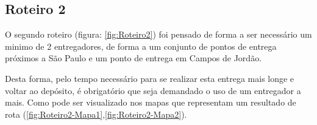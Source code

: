\begin{center}
	\label{fig:Roteiro1-G500P50-SwapMutation}
\end{center}


\subsection{Roteiro 2}

O segundo roteiro (figura: \ref{fig:Roteiro2}) foi pensado de forma a ser necessário um minimo de 2 entregadores, de forma a um conjunto de pontos de entrega próximos a São Paulo e um ponto de entrega em Campos de Jordão.

Desta forma, pelo tempo necessário para se realizar esta entrega mais longe e voltar ao depósito, é obrigatório que seja demandado o uso de um entregador a mais. Como pode ser visualizado nos mapas que representam um resultado de rota (\ref{fig:Roteiro2-Mapa1},\ref{fig:Roteiro2-Mapa2}).

